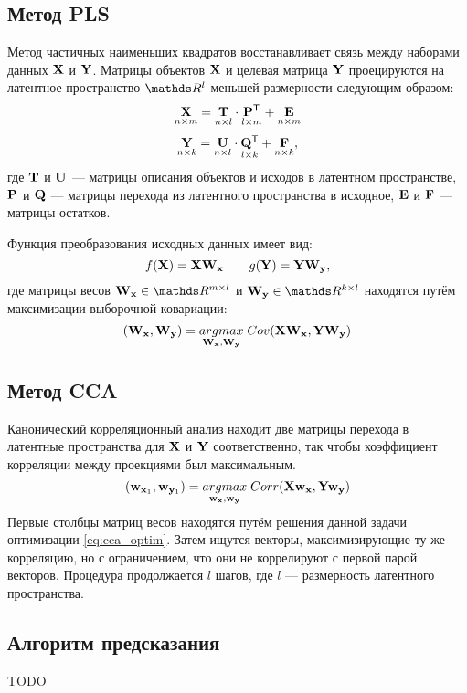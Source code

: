 \documentclass[a4paper]{article}
\begin{document}
\subsection{Метод PLS}
Метод частичных наименьших квадратов восстанавливает связь между наборами данных $\mathbf{X}$ и $\mathbf{Y}$. 
Матрицы объектов $\mathbf{X}$ и целевая матрица $\mathbf{Y}$ проецируются на латентное пространство $\dR^l$ меньшей размерности следующим образом:
$$ \underset{n \times m}{\mathbf{X}} = \underset{n \times l}{\mathbf{T}} \cdot \underset{l \times m}{\mathbf{P}^{\mathsf{T}}} + \underset{n \times m}{\mathbf{E}} $$
$$ \underset{n \times k}{\mathbf{Y}} = \underset{n \times l}{\mathbf{U}} \cdot \underset{l \times k}{\mathbf{Q}^{\mathsf{T}}} + \underset{n \times k}{\mathbf{F}}, $$
где $\mathbf{T}$ и $\mathbf{U}$ --- матрицы описания объектов и исходов в латентном пространстве, $\mathbf{P}$ и $\mathbf{Q}$ --- матрицы перехода из латентного пространства в исходное, $\mathbf{E}$ и $\mathbf{F}$ --- матрицы остатков.

Функция преобразования исходных данных имеет вид: 
$$ f(\mathbf{X}) = \mathbf{X}\mathbf{W}_{\mathbf{x}} \qquad g(\mathbf{Y}) = \mathbf{Y}\mathbf{W}_{\mathbf{y}}, $$ 
где матрицы весов $\bW_{\bx} \in \dR^{m \times l}$ и $\bW_{\by} \in \dR^{k \times l}$ находятся путём максимизации выборочной ковариации:
$$ (\mathbf{W}_{\mathbf{x}}, \mathbf{W}_{\mathbf{y}}) = \underset{\mathbf{W}_{\mathbf{x}}, \mathbf{W}_{\mathbf{y}}}{argmax}\; Cov(\mathbf{X}\mathbf{W}_{\mathbf{x}}, \mathbf{Y}\mathbf{W}_{\mathbf{y}})$$

\subsection{Метод CCA}
Канонический корреляционный анализ находит две матрицы перехода в латентные пространства для $\mathbf{X}$ и $\mathbf{Y}$ соответственно, так чтобы коэффициент корреляции между проекциями был максимальным.
\begin{equation} \label{eq:cca_optim}
	(\mathbf{w}_{\mathbf{x}_1}, \mathbf{w}_{\mathbf{y}_1}) = \underset{\mathbf{w}_{\mathbf{x}}, \mathbf{w}_{\mathbf{y}}}{argmax}\; Corr(\mathbf{X}\mathbf{w}_{\mathbf{x}}, \mathbf{Y}\mathbf{w}_{\mathbf{y}})
\end{equation}
Первые столбцы матриц весов находятся путём решения данной задачи оптимизации \eqref{eq:cca_optim}. 
Затем ищутся векторы, максимизирующие ту же корреляцию, но с ограничением, что они не коррелируют с первой парой векторов.
Процедура продолжается $l$ шагов, где $l$ --- размерность латентного пространства.

\subsection{Алгоритм предсказания}
TODO



\end{document}
